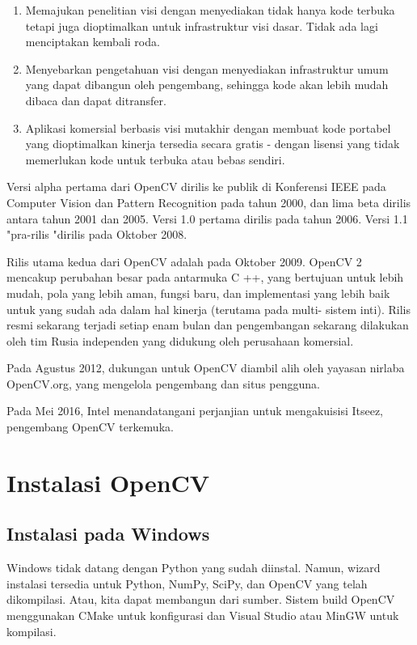     \begin{enumerate}
	\item Memajukan penelitian visi dengan menyediakan tidak hanya kode terbuka tetapi juga dioptimalkan untuk infrastruktur visi dasar. Tidak ada lagi menciptakan kembali roda.
	\item Menyebarkan pengetahuan visi dengan menyediakan infrastruktur umum yang dapat dibangun oleh pengembang, sehingga kode akan lebih mudah dibaca dan dapat ditransfer.
	\item Aplikasi komersial berbasis visi mutakhir dengan membuat kode portabel yang dioptimalkan kinerja tersedia secara gratis - dengan lisensi yang tidak memerlukan kode untuk terbuka atau bebas sendiri.
	\end{enumerate} 

	Versi alpha pertama dari OpenCV dirilis ke publik di Konferensi IEEE pada Computer Vision dan Pattern Recognition pada tahun 2000, dan lima beta dirilis antara tahun 2001 dan 2005. Versi 1.0 pertama dirilis pada tahun 2006. Versi 1.1 "pra-rilis "dirilis pada Oktober 2008.

	Rilis utama kedua dari OpenCV adalah pada Oktober 2009. OpenCV 2 mencakup perubahan besar pada antarmuka C ++, yang bertujuan untuk lebih mudah, pola yang lebih aman, fungsi baru, dan implementasi yang lebih baik untuk yang sudah ada dalam hal kinerja (terutama pada multi- sistem inti). Rilis resmi sekarang terjadi setiap enam bulan dan pengembangan sekarang dilakukan oleh tim Rusia independen yang didukung oleh perusahaan komersial.

	Pada Agustus 2012, dukungan untuk OpenCV diambil alih oleh yayasan nirlaba OpenCV.org, yang mengelola pengembang dan situs pengguna.

	Pada Mei 2016, Intel menandatangani perjanjian untuk mengakuisisi Itseez, pengembang OpenCV terkemuka.

\newpage
\section{Instalasi OpenCV}
\subsection{Instalasi pada Windows}

Windows tidak datang dengan Python yang sudah diinstal. Namun, wizard instalasi tersedia untuk Python, NumPy, SciPy, dan OpenCV yang telah dikompilasi. Atau, kita dapat membangun dari sumber. Sistem build OpenCV menggunakan CMake untuk konfigurasi dan Visual Studio atau MinGW untuk kompilasi.

